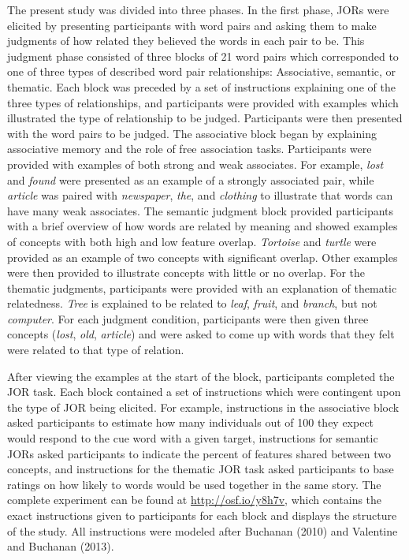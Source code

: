 \documentclass[english,,man]{apa6}
\begin{document}
The present study was divided into three phases. In the first phase, JORs were elicited by presenting participants with word pairs and asking them to make judgments of how related they believed the words in each pair to be. This judgment phase consisted of three blocks of 21 word pairs which corresponded to one of three types of described word pair relationships: Associative, semantic, or thematic. Each block was preceded by a set of instructions explaining one of the three types of relationships, and participants were provided with examples which illustrated the type of relationship to be judged. Participants were then presented with the word pairs to be judged. The associative block began by explaining associative memory and the role of free association tasks. Participants were provided with examples of both strong and weak associates. For example, \emph{lost} and \emph{found} were presented as an example of a strongly associated pair, while \emph{article} was paired with \emph{newspaper}, \emph{the}, and \emph{clothing} to illustrate that words can have many weak associates. The semantic judgment block provided participants with a brief overview of how words are related by meaning and showed examples of concepts with both high and low feature overlap. \emph{Tortoise} and \emph{turtle} were provided as an example of two concepts with significant overlap. Other examples were then provided to illustrate concepts with little or no overlap. For the thematic judgments, participants were provided with an explanation of thematic relatedness. \emph{Tree} is explained to be related to \emph{leaf}, \emph{fruit}, and \emph{branch}, but not \emph{computer}. For each judgment condition, participants were then given three concepts (\emph{lost}, \emph{old}, \emph{article}) and were asked to come up with words that they felt were related to that type of relation.

After viewing the examples at the start of the block, participants completed the JOR task. Each block contained a set of instructions which were contingent upon the type of JOR being elicited. For example, instructions in the associative block asked participants to estimate how many individuals out of 100 they expect would respond to the cue word with a given target, instructions for semantic JORs asked participants to indicate the percent of features shared between two concepts, and instructions for the thematic JOR task asked participants to base ratings on how likely to words would be used together in the same story. The complete experiment can be found at \url{http://osf.io/y8h7v}, which contains the exact instructions given to participants for each block and displays the structure of the study. All instructions were modeled after Buchanan (2010) and Valentine and Buchanan (2013).
\end{document}
